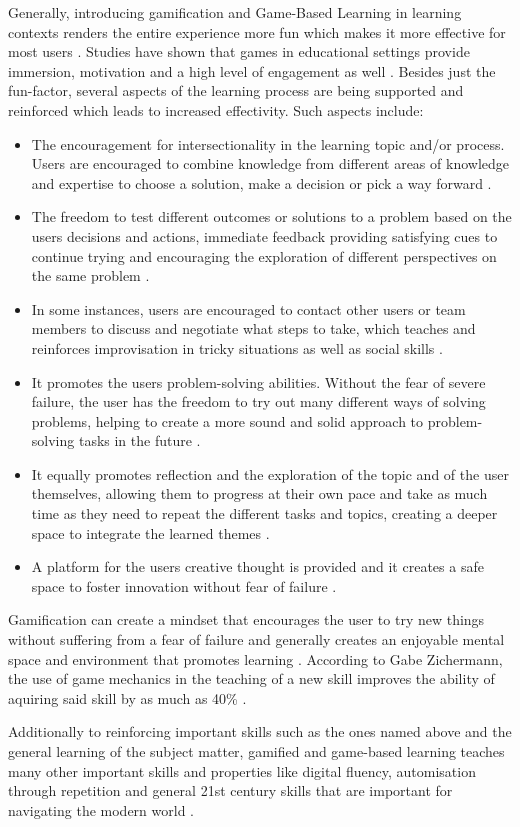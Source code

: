 Generally, introducing gamification and Game-Based Learning in learning contexts renders the entire experience more fun which makes it more effective for most users \cite{aspects}.
Studies have shown that games in educational settings provide immersion, motivation and a high level of engagement as well \cite{framework}.
Besides just the fun-factor, several aspects of the learning process are being supported and reinforced which leads to increased effectivity.
Such aspects include:
\begin{itemize}    
\item The encouragement for intersectionality in the learning topic and/or process. Users are encouraged to combine knowledge from different areas of knowledge and expertise to choose a solution, make a decision or pick a way forward \cite{aspects}.
\item The freedom to test different outcomes or solutions to a problem based on the users decisions and actions, immediate feedback providing satisfying cues to continue trying and encouraging the exploration of different perspectives on the same problem \cite{aspects}.
\item In some instances, users are encouraged to contact other users or team members to discuss and negotiate what steps to take, which teaches and reinforces improvisation in tricky situations as well as social skills \cite{aspects}.
\item It promotes the users problem-solving abilities. Without the fear of severe failure, the user has the freedom to try out many different ways of solving problems, helping to create a more sound and solid approach to problem-solving tasks in the future \cite{compare}.
\item It equally promotes reflection and the exploration of the topic and of the user themselves, allowing them to progress at their own pace and take as much time as they need to repeat the different tasks and topics, creating a deeper space to integrate the learned themes \cite{engage}.
\item A platform for the users creative thought is provided and it creates a safe space to foster innovation without fear of failure \cite{compare} \cite{traditional}.
\end{itemize}

Gamification can create a mindset that encourages the user to try new things without suffering from a fear of failure and generally creates an enjoyable mental space and environment that promotes learning \cite{engage} \cite{compare}.
According to Gabe Zichermann, the use of game mechanics in the teaching of a new skill improves the ability of aquiring said skill by as much as 40\% \cite{edu}.
    
Additionally to reinforcing important skills such as the ones named above and the general learning of the subject matter, gamified and game-based learning teaches many other important skills and properties like digital fluency, automisation through repetition and general 21st century skills that are important for navigating the modern world \cite{framework} \cite{domestic}.